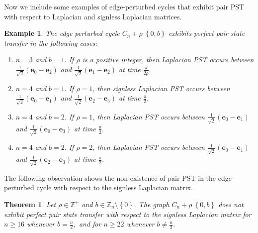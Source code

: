\documentclass[12pt,a4paper]{article}
\newtheorem{thm}{Theorem}
\newtheorem{exm}{Example}
\def \e {{\mathbf e}}
\newcommand{\cb}[1]{\left\lbrace #1\right\rbrace}
\begin{document}
Now we include some examples of edge-perturbed cycles that exhibit pair PST with respect to Laplacian and signless Laplacian matrices.
\begin{exm}
The edge perturbed cycle $C_n+\rho~\cb{0,b}$ exhibits perfect pair state transfer in the following cases:
	\begin{enumerate}
		\item $n=3$ and $b=1.$ If $\rho$ is a positive integer, then Laplacian PST occurs between $\frac{1}{\sqrt{2}}(\e_0-\e_2)$ and $\frac{1}{\sqrt{2}}(\e_1-\e_2)$ at time $\frac{\pi}{2\rho}.$
		\item $n=4$ and $b=1.$ If $\rho=1$, then signless Laplacian PST occurs between $\frac{1}{\sqrt{2}}(\e_0-\e_1)$ and $\frac{1}{\sqrt{2}}(\e_2-\e_3)$ at time $\frac{\pi}{2}.$ 
		\item $n=4$ and $b=2.$ If $\rho=1$, then Laplacian PST occurs between $\frac{1}{\sqrt{2}}(\e_0-\e_1)$ and $\frac{1}{\sqrt{2}}(\e_0-\e_3)$ at time $\frac{\pi}{2}.$ 
		\item $n=4$ and $b=2.$ If $\rho=2$, then Laplacian PST occurs between $\frac{1}{\sqrt{2}}(\e_0-\e_1)$ and $\frac{1}{\sqrt{2}}(\e_2-\e_3)$ at time $\frac{\pi}{2}.$ 
	\end{enumerate}

\end{exm}
The following observation shows the non-existence of pair PST in the edge-perturbed cycle with respect to the signless Laplacian matrix. 

\begin{thm}
Let $\rho \in \mathbb{Z}^+$ and $b \in \mathbb{Z}_n\setminus \cb{0}.$ The graph $C_n+\rho~\cb {0,b}$ does not exhibit perfect pair state transfer with respect to the signless Laplacian matrix for $n \geq 16$ whenever $b=\frac{n}{2},$ and for $n \geq 22$ whenever $b\neq \frac{n}{2}$.
\end{thm}
\end{document}
